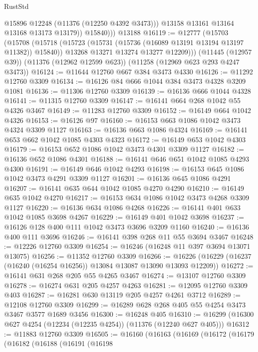 \begin{lexlean}{RustStd}
\begin{coremodule}
{\begin{coremodule}
{{{{{{{{{{{{{{{{{{{{{{{{{{{{{{{{{{{{{{{{{{{{{{{{{{{{{{{{{{{{{{{{{{{{{{{{{{{{{{{{{{{{{                @15896
                @12248
                (@11376 (@12250 @4392 @3473)))
              @13158
              @13161
              @13164
              @13168
              @13173
              @13179))
          @15840)))
    @13188
@16119 := @12777
    (@15703
      (@15708
        (@15718
          (@15723 (@15731 (@15736 (@16089 @13191 @13194 @13197 @11382)) @15840))
          @13268
          @13271
          @13274
          @13277
          @12209)))
    (@11445 (@12957 @39))
    (@11376 (@12962 @12599 @623))
    (@11258 (@12969 @623 @293 @4247 @3473))
@16124 := @11644 @12760 @667 @384 @3473 @4330
@16126 := @11292 @12760 @3309
@16134 := @16126 @84 @666 @1044 @384 @3473 @4328 @3209 @1081
@16136 := @11306 @12760 @3309
@16139 := @16136 @666 @1044 @4328
@16141 := @11315 @12760 @3309
@16147 := @16141 @664 @268 @1042 @55 @4326 @3467
@16149 := @11283 @12760 @3309
@16152 := @16149 @664 @1042 @4326
@16153 := @16126 @97
@16160 := @16153 @663 @1086 @1042 @3473 @4324 @3309 @1127
@16163 := @16136 @663 @1086 @4324
@16169 := @16141 @653 @662 @1042 @1085 @4303 @4323
@16172 := @16149 @653 @1042 @4303
@16179 := @16153 @652 @1086 @1042 @3473 @4301 @3309 @1127
@16182 := @16136 @652 @1086 @4301
@16188 := @16141 @646 @651 @1042 @1085 @4293 @4300
@16191 := @16149 @646 @1042 @4293
@16198 := @16153 @645 @1086 @1042 @3473 @4291 @3309 @1127
@16201 := @16136 @645 @1086 @4291
@16207 := @16141 @635 @644 @1042 @1085 @4270 @4290
@16210 := @16149 @635 @1042 @4270
@16217 := @16153 @634 @1086 @1042 @3473 @4268 @3309 @1127
@16220 := @16136 @634 @1086 @4268
@16226 := @16141 @401 @633 @1042 @1085 @3698 @4267
@16229 := @16149 @401 @1042 @3698
@16237 := @16126 @128 @400 @111 @1042 @3473 @3696 @3209 @1160
@16240 := @16136 @400 @111 @3696
@16246 := @16141 @398 @268 @11 @55 @3694 @3467
@16248 := @12226 @12760 @3309
@16254 := @16246 (@16248 @11 @397 @3694 @13071 @13075)
@16256 := @11352 @12760 @3309
@16266 := @16226 (@16229 (@16237 (@16240 (@16254 @16256)) @13084 @13087 @13090 @13093 @12209))
@16272 := @16141 @631 @268 @205 @55 @4265 @3467
@16274 := @13107 @12760 @3309
@16278 := @16274 @631 @205 @4257 @4263
@16281 := @12095 @12760 @3309 @403
@16287 := @16281 @630 @13119 @205 @4257 @4261 @3712
@16289 := @12108 @12760 @3309
@16299 := @16289 @628 @268 @405 @55 @4254 @3473 @3467 @3577 @1689 @3456
@16300 := @16248 @405
@16310 := @16299 (@16300 @627 @4254 (@12234 (@12235 @4254)) (@11376 (@12240 @627 @405)))
@16312 := @11883 @12760 @3309
@16505 := @16160
    (@16163
      (@16169
        (@16172
          (@16179
            (@16182
              (@16188
                (@16191
                  (@16198
}}}}}}}}}}}}}}}}}}}}}}}}}}}}}}}}}}}}}}}}}}}}}}}}}}}}}}}}}}}}}}}}}}}}}}}}}}}}}}}}}}}}}
\end{coremodule}}
\end{coremodule}
\end{lexlean}
